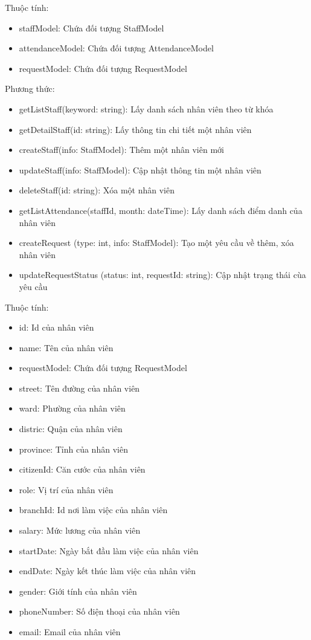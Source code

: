 Thuộc tính:
\begin{itemize}
	\item staffModel: Chứa đối tượng StaffModel
	\item attendanceModel: Chứa đối tượng AttendanceModel
	\item requestModel: Chứa đối tượng RequestModel
\end{itemize}
Phương thức:
\begin{itemize}
	\item getListStaff(keyword: string): Lấy danh sách nhân viên theo từ khóa
	\item getDetailStaff(id: string): Lấy thông tin chi tiết một nhân viên
	\item createStaff(info: StaffModel): Thêm một nhân viên mới
	\item updateStaff(info: StaffModel): Cập nhật thông tin một nhân viên
	\item deleteStaff(id: string): Xóa một nhân viên
	\item getListAttendance(staffId, month: dateTime): Lấy danh sách điểm danh của nhân viên
	\item createRequest (type: int, info: StaffModel): Tạo một yêu cầu về thêm, xóa nhân viên
	\item updateRequestStatus (status: int, requestId: string): Cập nhật trạng thái cùa yêu cầu
\end{itemize}

Thuộc tính:
\begin{itemize}
	\item id: Id của nhân viên
	\item name: Tên của nhân viên
	\item requestModel: Chứa đối tượng RequestModel
	\item street: Tên đường của nhân viên
	\item ward: Phường của nhân viên
	\item distric: Quận của nhân viên
	\item province: Tỉnh của nhân viên
	\item citizenId: Căn cước của nhân viên
	\item role: Vị trí của nhân viên
	\item branchId: Id nơi làm việc của nhân viên
	\item salary: Mức lương của nhân viên
	\item startDate: Ngày bắt đầu làm việc của nhân viên
	\item endDate: Ngày kết thúc làm việc của nhân viên
	\item gender: Giới tính của nhân viên
	\item phoneNumber: Số điện thoại của nhân viên
	\item email: Email của nhân viên
\end{itemize}


